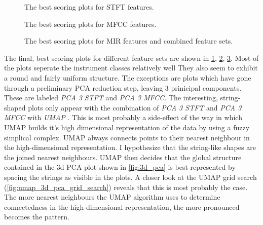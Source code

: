 \documentclass[a4paper, 12pt, twoside]{report}
\begin{document}
\begin{figure}[h!tbp]
\centering
{}
\caption{\label{fig:best_overall_stft}The best scoring plots for STFT features.}
\end{figure}

\begin{figure}[h!tbp]
\centering
{}
\caption{\label{fig:best_overall_mfcc}The best scoring plots for MFCC features.}
\end{figure}

\begin{figure}[h!tbp]
\centering
{}
\caption{\label{fig:best_overall_combined}The best scoring plots for MIR features and combined feature sets.}
\end{figure}

The final, best scoring plots for different feature sets are shown in \ref{fig:best_overall_stft}, \ref{fig:best_overall_mfcc}, \ref{fig:best_overall_combined}. Most of the plots seperate the instrument classes relatively well They also seem to exhibit a round and fairly uniform structure. The exceptions are plots which have gone through a preliminary PCA reduction step, leaving 3 prinicipal components. These are labeled \textit{PCA 3 STFT} and \textit{PCA 3 MFCC}. The interesting, string-shaped plots only appear with the combination of \textit{ PCA 3 STFT } and \textit{ PCA 3 MFCC } with \textit{ UMAP }. This is most probably a side-effect of the way in which UMAP builds it's high dimensional representation of the data by using a fuzzy simplical complex. UMAP always connects points to their nearest neighbour in the high-dimensional representation. I hypothesize that the string-like shapes are the joined nearest neighbours. UMAP then decides that the global structure contained in the 3d PCA plot shown in \ref{fig:3d_pca} is best represented by spacing the strings as visible in the plots. A closer look at the UMAP grid search (\ref{fig:umap_3d_pca_grid_search}) reveals that this is most probably  the case. The more nearest neighbours the UMAP algorithm uses to determine connectedness in the high-dimensional representation, the more pronounced becomes the pattern.
\end{document}
